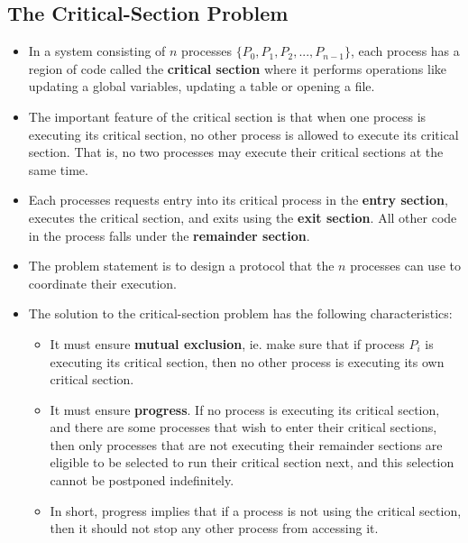 \documentclass{article}
\theoremstyle{plain}
\theoremstyle{definition}
\begin{document}
\subsection{The Critical-Section Problem}
\begin{itemize}
    \item In a system consisting of $n$ processes $ \{ P_0, P_1, P_2, ..., P_{n-1} \}$, each process has a region of code called the \textbf{critical section} where it performs operations like updating a global variables, updating a table or opening a file. 
    
    \item The important feature of the critical section is that when one process is executing its critical section, no other process is allowed to execute its critical section. That is, no two processes may execute their critical sections at the same time.
    
    \item Each processes requests entry into its critical process in the \textbf{entry section}, executes the critical section, and exits using the \textbf{exit section}. All other code in the process falls under the \textbf{remainder section}. 
    
    \item The problem statement is to design a protocol that the $n$ processes can use to coordinate their execution. 
    
    \item The solution to the critical-section problem has the following characteristics:
    \begin{itemize}
        \item It must ensure \textbf{mutual exclusion}, ie. make sure that if process $P_i$ is executing its critical section, then no other process is executing its own critical section.
        
        \item It must ensure \textbf{progress}. If no process is executing its critical section, and there are some processes that wish to enter their critical sections, then only processes that are not executing their remainder sections are eligible to be selected to run their critical section next, and this selection cannot be postponed indefinitely.
        
        \item In short, progress implies that if a process is not using the critical section, then it should not stop any other process from accessing it.
        

\end{itemize}
\end{itemize}
\end{document}
